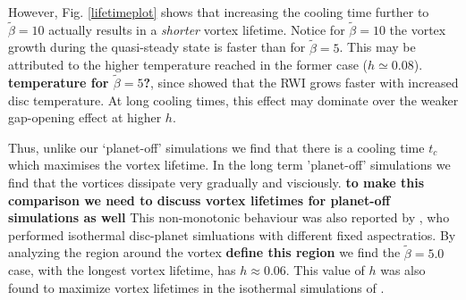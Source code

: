However, Fig. \ref{lifetimeplot} shows that increasing the cooling
time further to $\tilde{\beta}=10$ actually results in a
\emph{shorter} vortex lifetime. Notice for $\tilde{\beta}=10$ the vortex growth 
during the quasi-steady state is faster than for
$\tilde{\beta}=5$. This may be attributed to the higher temperature
reached in the former case ($h\simeq 0.08$). {\bf temperature for
  $\tilde{\beta}=5$?}, since \cite{li00} showed that the RWI grows
faster with increased disc temperature. At long cooling times, this
effect may dominate over the weaker gap-opening effect at higher $h$.   


Thus, unlike our `planet-off' simulations we find that there is
a cooling time $t_c$ which maximises the vortex lifetime. In the long term
 'planet-off' simulations we find that the vortices dissipate very gradually and visciously. {\bf to make
this comparison we need to discuss vortex lifetimes for planet-off
simulations as well} 
This
non-monotonic behaviour was also reported by \cite{fu14}, who
performed isothermal disc-planet simluations with different fixed
aspectratios.   
By analyzing the region
around the vortex {\bf define this region} we find the
$\tilde\beta=5.0$ case, with the longest vortex lifetime, has
$h\approx0.06$. This value of $h$ was also found to maximize vortex
lifetimes in the isothermal simulations of \cite{fu14}. 









